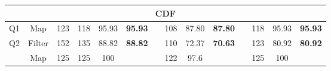 \begin{table}
\begin{tabular}{cccccclccclccc}
\multicolumn{14}{c}{\textbf{CDF}}                                                                                                                                                                                                                                                                                                                                                                                                                                                                                                                                                                                                                                                                                                \\ \hline
Q1                              & Map                                 & 123                                   & 118                                                                    & 95.93                                                                     & \textbf{95.93}                  &                      & 108                                                                    & 87.80                                                                     & \textbf{87.80}                  &                      & 118                                                                    & 95.93                                                                     & \textbf{95.93}                  \\ \hline
\multirow{2}{*}{Q2}             & Filter                              & 152                                   & 135                                                                    & 88.82                                                                     & \multirow{2}{*}{\textbf{88.82}} &                      & 110                                                                    & 72.37                                                                     & \multirow{2}{*}{\textbf{70.63}} &                      & 123                                                                    & 80.92                                                                     & \multirow{2}{*}{\textbf{80.92}} \\
                                & Map                                 & 125                                   & 125                                                                    & 100                                                                       &                                 &                      & 122                                                                    & 97.6                                                                      &                                 &                      & 125                                                                    & 100                                                                       &                                 \\ \hline

\end{tabular}
\end{table}
